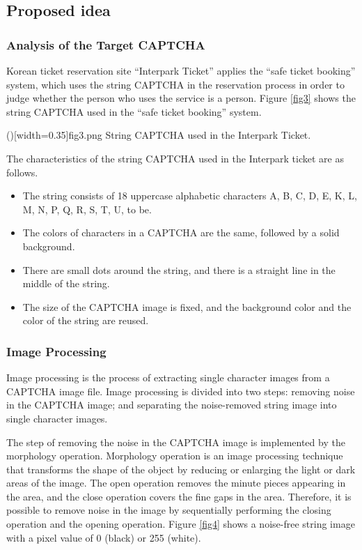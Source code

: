 \documentclass{ieeeaccess}
\begin{document}
\subsection{Proposed idea}
\subsubsection{Analysis of the Target CAPTCHA}
Korean ticket reservation site ``Interpark Ticket'' applies the ``safe ticket booking'' system, which uses the string CAPTCHA in the reservation process in order to judge whether the person who uses the service is a person.
Figure \ref{fig3} shows the string CAPTCHA used in the ``safe ticket booking'' system.

\Figure[t]()[width=0.35\textwidth]{fig3.png}
   {String CAPTCHA used in the Interpark Ticket.\label{fig3}}

The characteristics of the string CAPTCHA used in the Interpark ticket are as follows.
\begin{itemize}
	\item The string consists of 18 uppercase alphabetic characters A, B, C, D, E, K, L, M, N, P, Q, R, S, T, U, to be.
	\item The colors of characters in a CAPTCHA are the same, followed by a solid background.
	\item There are small dots around the string, and there is a straight line in the middle of the string.
	\item The size of the CAPTCHA image is fixed, and the background color and the color of the string are reused.
\end{itemize}

\subsubsection{Image Processing}
Image processing is the process of extracting single character images from a CAPTCHA image file. 
Image processing is divided into two steps: removing noise in the CAPTCHA image; and separating the noise-removed string image into single character images.

The step of removing the noise in the CAPTCHA image is implemented by the morphology operation. 
Morphology operation is an image processing technique that transforms the shape of the object by reducing or enlarging the light or dark areas of the image. 
The open operation removes the minute pieces appearing in the area, and the close operation covers the fine gaps in the area. 
Therefore, it is possible to remove noise in the image by sequentially performing the closing operation and the opening operation. 
Figure \ref{fig4} shows a noise-free string image with a pixel value of 0 (black) or 255 (white).
\end{document}
